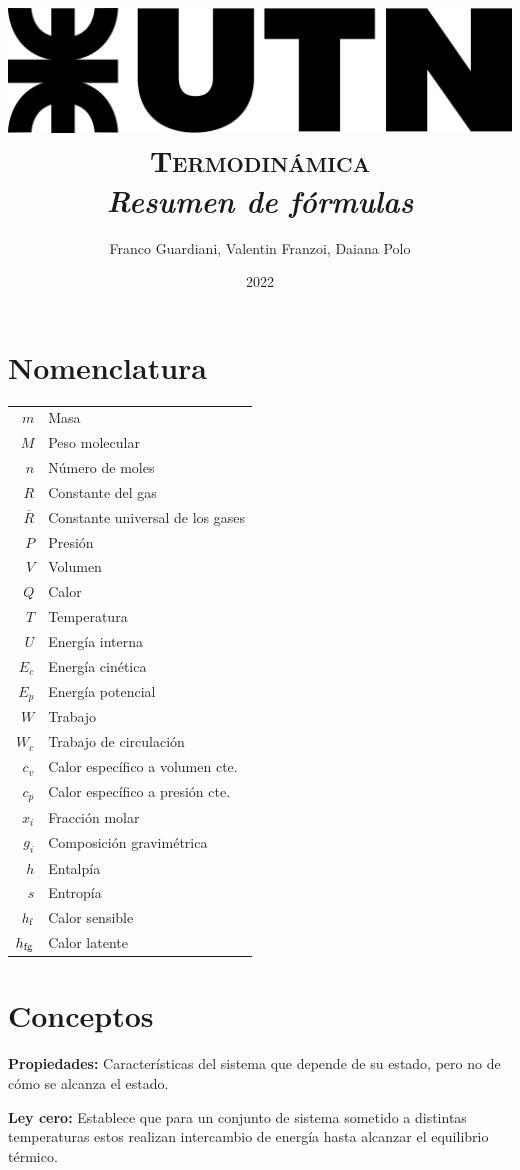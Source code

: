 \documentclass[11pt,a4paper,twocolumn]{article}
\author{Franco Guardiani, Valentin Franzoi, Daiana Polo}
\title{\includegraphics[width=.3\textwidth]{utn} \\ \textsc{Termodinámica} \\ \textsl{Resumen de fórmulas} \\ }
\date{2022}
\begin{document}
	\pagestyle{fancy}
	\maketitle
	\section*{Nomenclatura}
	\begin{tabular}{r l}
		$m$ & Masa \\
		$M$ & Peso molecular \\
		$n$ & Número de moles \\
		$R$ & Constante del gas \\
		$\overline{R}$ & Constante universal de los gases \\
		$P$ & Presión \\
		$V$ & Volumen \\
		$Q$ & Calor \\
		$T$ & Temperatura \\
		$U$ & Energía interna \\
		$E_{c}$ & Energía cinética \\
		$E_{p}$ & Energía potencial \\
		$W$ & Trabajo \\
		$W_{c}$& Trabajo de circulación\\
		$c_{v}$ & Calor específico a volumen cte. \\
		$c_{p}$ & Calor específico a presión cte. \\
		$x_i$ & Fracción molar \\
		$g_i$ & Composición gravimétrica \\
		$h$ & Entalpía \\
		$s$ & Entropía \\
		$h_\textup{f}$ & Calor sensible \\
		$h_\textup{fg}$ & Calor latente \\
		
		
		
	\end{tabular}
	
	\newpage
	
	\section*{Conceptos}
		
	\textbf{Propiedades:} Características del sistema que depende de su estado, pero no de cómo se alcanza el estado.
	
	\textbf{Ley cero:} Establece que para un conjunto de sistema sometido a distintas temperaturas estos realizan intercambio de energía hasta alcanzar el equilibrio térmico.
	
\end{document}
